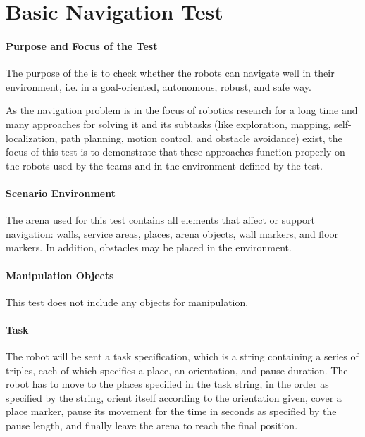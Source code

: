 \newpage
\section{Basic Navigation Test}
\label{sec:Basic Navigation Test}

\paragraph{Purpose and Focus of the Test}
The purpose of the  is to check whether the robots can navigate well in their environment, i.e. in a goal-oriented, autonomous, robust, and safe way.
\par
As the navigation problem is in the focus of robotics research for a long time and many approaches for solving it and its subtasks (like exploration, mapping, self-localization, path planning, motion control, and obstacle avoidance) exist, the focus of this test is to demonstrate that these approaches function properly on the robots used by the teams and in the environment defined by the test.
\par

\paragraph{Scenario Environment}
The arena used for this test contains all elements that affect or support navigation: walls, service areas, places, arena objects, wall markers, and floor markers. In addition, obstacles may be placed in the environment.

\paragraph{Manipulation Objects}
This test does not include any objects for manipulation.
\paragraph{Task}
The robot will be sent a task specification, which is a string containing a series of triples, each of which specifies a place, an orientation, and pause duration. The robot has to move to the places specified in the task string, in the order as specified by the string, orient itself according to the orientation given, cover a place marker, pause its movement for the time in seconds as specified by the pause length, and finally leave the arena to reach the final position.

